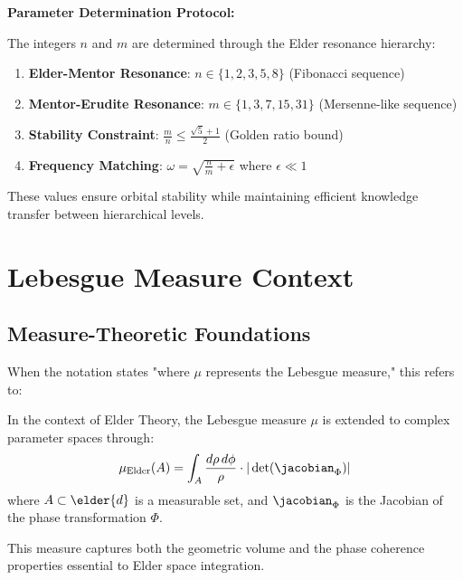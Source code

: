 \textbf{Parameter Determination Protocol:}

The integers $n$ and $m$ are determined through the Elder resonance hierarchy:

\begin{enumerate}
    \item \textbf{Elder-Mentor Resonance}: $n \in \{1, 2, 3, 5, 8\}$ (Fibonacci sequence)
    \item \textbf{Mentor-Erudite Resonance}: $m \in \{1, 3, 7, 15, 31\}$ (Mersenne-like sequence)
    \item \textbf{Stability Constraint}: $\frac{m}{n} \leq \frac{\sqrt{5}+1}{2}$ (Golden ratio bound)
    \item \textbf{Frequency Matching}: $\omega = \sqrt{\frac{n}{m} + \epsilon}$ where $\epsilon \ll 1$
\end{enumerate}

These values ensure orbital stability while maintaining efficient knowledge transfer between hierarchical levels.

\section{Lebesgue Measure Context}

\subsection{Measure-Theoretic Foundations}

When the notation states "where $\mu$ represents the Lebesgue measure," this refers to:

\begin{definition}
In the context of Elder Theory, the Lebesgue measure $\mu$ is extended to complex parameter spaces through:
\begin{equation}
\mu_{\text{Elder}}(A) = \int_A \frac{d\rho \, d\phi}{\rho} \cdot |\det(\jacobian_{\Phi})|
\end{equation}
where $A \subset \elder{d}$ is a measurable set, and $\jacobian_{\Phi}$ is the Jacobian of the phase transformation $\Phi$.
\end{definition}

This measure captures both the geometric volume and the phase coherence properties essential to Elder space integration.